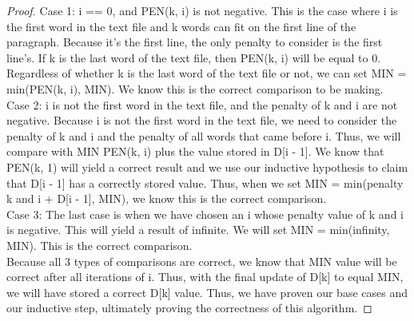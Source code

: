 \documentclass[11pt, solution, letterpaper]{format}
\begin{document}
\begin{proof}
Case 1: i == 0, and PEN(k, i) is not negative. This is the case where i is the first word in the text file and k words can fit on the first line of the paragraph. Because it's the first line, the only penalty to consider is the first line's. If k is the last word of the text file, then PEN(k, i) will be equal to 0. Regardless of whether k is the last word of the text file or not, we can set MIN =  min(PEN(k, i), MIN). We know this is the correct comparison to be making.\\ 
Case 2: i is not the first word in the text file, and the penalty of k and i are not negative. Because i is not the first word in the text file, we need to consider the penalty of k and i and the penalty of all words that came before i. Thus, we will compare with MIN PEN(k, i) plus the value stored in D[i - 1]. We know that PEN(k, 1) will yield a correct result and we use our inductive hypothesis to claim that D[i - 1] has a correctly stored value. Thus, when we set MIN = min(penalty k and i + D[i - 1], MIN), we know this is the correct comparison.\\
Case 3: The last case is when we have chosen an i whose penalty value of k and i is negative. This will yield a result of infinite. We will set MIN = min(infinity, MIN). This is the correct comparison.\\

Because all 3 types of comparisons are correct, we know that MIN value will be correct after all iterations of i. Thus, with the final update of D[k] to equal MIN, we will have stored a correct D[k] value. Thus, we have proven our base cases and our inductive step, ultimately proving the correctness of this algorithm.\end{proof}
\end{document}
